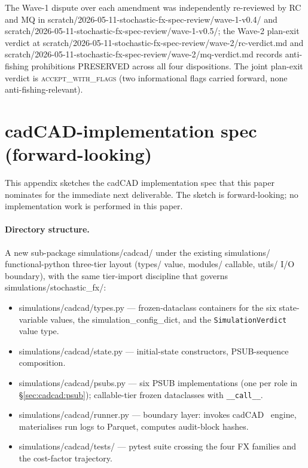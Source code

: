 \documentclass[11pt,letterpaper]{article}
\begin{document}
The Wave-1 dispute over each amendment was independently re-reviewed
by RC and MQ in
\textsf{scratch/2026-05-11-stochastic-fx-spec-review/wave-1-v0.4/} and
\textsf{scratch/2026-05-11-stochastic-fx-spec-review/wave-1-v0.5/};
the Wave-2 plan-exit verdict at
\textsf{scratch/2026-05-11-stochastic-fx-spec-review/wave-2/rc-verdict.md}
and \textsf{scratch/2026-05-11-stochastic-fx-spec-review/wave-2/mq-verdict.md}
records anti-fishing prohibitions PRESERVED across all four
dispositions. The joint plan-exit verdict is
\textsc{accept\_with\_flags} (two informational flags carried forward,
none anti-fishing-relevant).

\section{cadCAD-implementation spec (forward-looking)}
\label{app:cadcad-spec}

This appendix sketches the cadCAD implementation spec that this paper
nominates for the immediate next deliverable. The sketch is
forward-looking; no implementation work is performed in this paper.

\paragraph{Directory structure.}
A new sub-package \textsf{simulations/cadcad/} under the existing
\textsf{simulations/} functional-python three-tier layout
(\textsf{types/} value, \textsf{modules/} callable,
\textsf{utils/} I/O boundary), with the same tier-import discipline
that governs \textsf{simulations/stochastic\_fx/}:
\begin{itemize}
    \item \textsf{simulations/cadcad/types.py} — frozen-dataclass
        containers for the six state-variable values, the
        simulation\_config\_dict, and the
        \texttt{SimulationVerdict} value type.
    \item \textsf{simulations/cadcad/state.py} — initial-state
        constructors, PSUB-sequence composition.
    \item \textsf{simulations/cadcad/psubs.py} — six PSUB
        implementations (one per role in
        \S\ref{sec:cadcad:psub}); callable-tier frozen dataclasses
        with \texttt{\_\_call\_\_}.
    \item \textsf{simulations/cadcad/runner.py} — boundary layer:
        invokes cadCAD~\cite{cadcad} engine, materialises run logs to
        Parquet, computes audit-block hashes.
    \item \textsf{simulations/cadcad/tests/} — pytest suite crossing
        the four FX families and the cost-factor trajectory.
\end{itemize}
\end{document}
